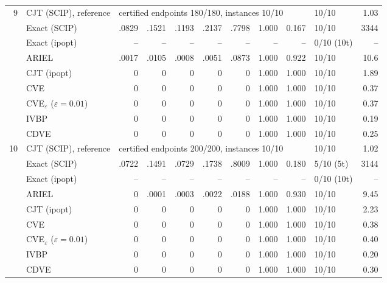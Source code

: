 \begin{table}[htbp]
\begin{tabular}{rlrrrrrrrlr}
\midrule
9 & CJT (SCIP), reference & \multicolumn{7}{l}{certified endpoints 180/180, instances 10/10} & 10/10 & 1.03 \\
 & Exact (SCIP) & .0829 & .1521 & .1193 & .2137 & .7798 & 1.000 & 0.167 & 10/10 & 3344 \\
 & Exact (ipopt) & -- & -- & -- & -- & -- & -- & -- & 0/10 (10t) & -- \\
 & ARIEL & .0017 & .0105 & .0008 & .0051 & .0873 & 1.000 & 0.922 & 10/10 & 10.6 \\
 & CJT (ipopt) & 0 & 0 & 0 & 0 & 0 & 1.000 & 1.000 & 10/10 & 1.89 \\
 & CVE & 0 & 0 & 0 & 0 & 0 & 1.000 & 1.000 & 10/10 & 0.37 \\
 & CVE$_\varepsilon$ ($\varepsilon{=}0.01$) & 0 & 0 & 0 & 0 & 0 & 1.000 & 1.000 & 10/10 & 0.37 \\
 & IVBP & 0 & 0 & 0 & 0 & 0 & 1.000 & 1.000 & 10/10 & 0.19 \\
 & CDVE & 0 & 0 & 0 & 0 & 0 & 1.000 & 1.000 & 10/10 & 0.25 \\
\midrule
10 & CJT (SCIP), reference & \multicolumn{7}{l}{certified endpoints 200/200, instances 10/10} & 10/10 & 1.02 \\
 & Exact (SCIP) & .0722 & .1491 & .0729 & .1738 & .8009 & 1.000 & 0.180 & 5/10 (5t) & 3144 \\
 & Exact (ipopt) & -- & -- & -- & -- & -- & -- & -- & 0/10 (10t) & -- \\
 & ARIEL & 0 & .0001 & .0003 & .0022 & .0188 & 1.000 & 0.930 & 10/10 & 9.45 \\
 & CJT (ipopt) & 0 & 0 & 0 & 0 & 0 & 1.000 & 1.000 & 10/10 & 2.23 \\
 & CVE & 0 & 0 & 0 & 0 & 0 & 1.000 & 1.000 & 10/10 & 0.38 \\
 & CVE$_\varepsilon$ ($\varepsilon{=}0.01$) & 0 & 0 & 0 & 0 & 0 & 1.000 & 1.000 & 10/10 & 0.40 \\
 & IVBP & 0 & 0 & 0 & 0 & 0 & 1.000 & 1.000 & 10/10 & 0.20 \\
 & CDVE & 0 & 0 & 0 & 0 & 0 & 1.000 & 1.000 & 10/10 & 0.30 \\
\bottomrule
\end{tabular}
\end{table}
